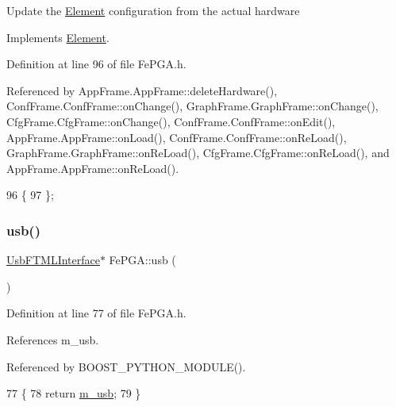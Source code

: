 Update the \hyperlink{classElement}{Element} configuration from the actual hardware 

Implements \hyperlink{classElement_a4e6c83efae95616ebddd03c793a26661}{Element}.



Definition at line 96 of file Fe\+P\+G\+A.\+h.



Referenced by App\+Frame.\+App\+Frame\+::delete\+Hardware(), Conf\+Frame.\+Conf\+Frame\+::on\+Change(), Graph\+Frame.\+Graph\+Frame\+::on\+Change(), Cfg\+Frame.\+Cfg\+Frame\+::on\+Change(), Conf\+Frame.\+Conf\+Frame\+::on\+Edit(), App\+Frame.\+App\+Frame\+::on\+Load(), Conf\+Frame.\+Conf\+Frame\+::on\+Re\+Load(), Graph\+Frame.\+Graph\+Frame\+::on\+Re\+Load(), Cfg\+Frame.\+Cfg\+Frame\+::on\+Re\+Load(), and App\+Frame.\+App\+Frame\+::on\+Re\+Load().


\begin{DoxyCode}
96                  \{
97   \};
\end{DoxyCode}
\mbox{\label{classFePGA_a4a7889dc3c2f88f623876ca475e66410}} 
\subsubsection{\texorpdfstring{usb()}{usb()}}
{\footnotesize\ttfamily \hyperlink{classUsbFTMLInterface}{Usb\+F\+T\+M\+L\+Interface}$\ast$ Fe\+P\+G\+A\+::usb (\begin{DoxyParamCaption}{ }\end{DoxyParamCaption})\hspace{0.3cm}{\ttfamily [inline]}}



Definition at line 77 of file Fe\+P\+G\+A.\+h.



References m\+\_\+usb.



Referenced by B\+O\+O\+S\+T\+\_\+\+P\+Y\+T\+H\+O\+N\+\_\+\+M\+O\+D\+U\+L\+E().


\begin{DoxyCode}
77                          \{
78     \textcolor{keywordflow}{return} \hyperlink{classFePGA_afb7947e600a66d914ee524acec3d8b1f}{m\_usb};
79   \}
\end{DoxyCode}
\mbox{\label{classObject_a83d2db2df682907ea1115ad721c1c4a1}} 
